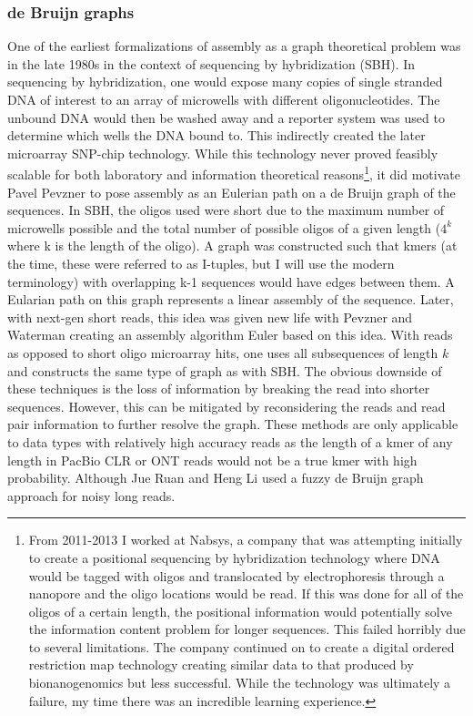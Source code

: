 \subsubsection{de Bruijn graphs}
\par{
One of the earliest formalizations of assembly as a graph theoretical problem was in the late 1980s in the context of sequencing by hybridization (SBH)\cite{SBH}. In sequencing by hybridization, one would expose many copies of single stranded DNA of interest to an array of microwells with different oligonucleotides. The unbound DNA would then be washed away and a reporter system was used to determine which wells the DNA bound to. This indirectly created the later microarray SNP-chip technology. While this technology never proved feasibly scalable for both laboratory and information theoretical reasons\cite{Preparata}\footnote{From 2011-2013 I worked at Nabsys, a company that was attempting initially to create a positional sequencing by hybridization\cite{positionalSBH} technology where DNA would be tagged with oligos and translocated by electrophoresis through a nanopore and the oligo locations would be read. If this was done for all of the oligos of a certain length, the positional information would potentially solve the information content problem for longer sequences. This failed horribly due to several limitations. The company continued on to create a digital ordered restriction map technology\cite{nabsyspatent} creating similar data to that produced by bionanogenomics but less successful. While the technology was ultimately a failure, my time there was an incredible learning experience.}, it did motivate Pavel Pevzner to pose assembly as an Eulerian path on a de Bruijn graph of the sequences. In SBH, the oligos used were short due to the maximum number of microwells possible and the total number of possible oligos of a given length ($4^{k}$ where k is the length of the oligo). A graph was constructed such that kmers (at the time, these were referred to as I-tuples, but I will use the modern terminology) with overlapping k-1 sequences would have edges between them. A Eularian path on this graph represents a linear assembly of the sequence. Later, with next-gen short reads, this idea was given new life with Pevzner and Waterman\cite{Pevzner2001} creating an assembly algorithm Euler based on this idea. With reads as opposed to short oligo microarray hits, one uses all subsequences of length $k$ and constructs the same type of graph as with SBH\cite{Zerbino2008}\cite{abyss}\cite{iqbal}. The obvious downside of these techniques is the loss of information by breaking the read into shorter sequences. However, this can be mitigated by reconsidering the reads and read pair information to further resolve the graph\cite{allpaths}\cite{discovar}. These methods are only applicable to data types with relatively high accuracy reads as the length of a kmer of any length in PacBio CLR or ONT reads would not be a true kmer with high probability. Although Jue Ruan and Heng Li used a fuzzy de Bruijn graph approach for noisy long reads.
}

